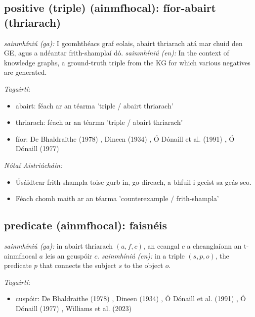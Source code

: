 \documentclass{article}
\begin{document}
\subsection*{positive (triple) (ainmfhocal): fíor-abairt (thriarach)} 
 \noindent \textit{sainmhíniú (ga):} I gcomhthéacs graf eolais, abairt thriarach atá mar chuid den GE, agus a ndéantar frith-shamplaí dó.
\newline\newline
 \noindent \textit{sainmhíniú (en):} In the context of knowledge graphs, a ground-truth triple from the KG for which various negatives are generated.
\newline

 \noindent \textit{Tagairtí:}
\begin{itemize}
	\item abairt: féach ar an téarma 'triple / abairt thriarach'
	\item thriarach: féach ar an téarma 'triple / abairt thriarach'
	\item fíor: De Bhaldraithe (1978) \cite{de-bhaldraithe}, Dineen (1934) \cite{dineen}, Ó Dónaill et al. (1991) \cite{focloir-beag}, Ó Dónaill (1977) \cite{odonaill}
\end{itemize}

 \noindent \textit{Nótaí Aistriúcháin:}
\begin{itemize}
	\item Úsáidtear frith-shampla toisc gurb in, go díreach, a bhfuil i gceist sa gcás seo.
	\item Féach chomh maith ar an téarma 'counterexample / frith-shampla'
\end{itemize}


\subsection*{predicate (ainmfhocal): faisnéis} 
 \noindent \textit{sainmhíniú (ga):} in abairt thriarach $(a,f,c)$, an ceangal $c$ a cheanglaíonn an t-ainmfhocal $a$ leis an gcuspóir $c$.
\newline\newline
 \noindent \textit{sainmhíniú (en):} in a triple $(s,p,o)$, the predicate $p$ that connects the subject $s$ to the object $o$.
\newline

 \noindent \textit{Tagairtí:}
\begin{itemize}
	\item cuspóir: De Bhaldraithe (1978) \cite{de-bhaldraithe}, Dineen (1934) \cite{dineen}, Ó Dónaill et al. (1991) \cite{focloir-beag}, Ó Dónaill (1977) \cite{odonaill}, Williams et al. (2023) \cite{storchiste}
\end{itemize}
\end{document}
